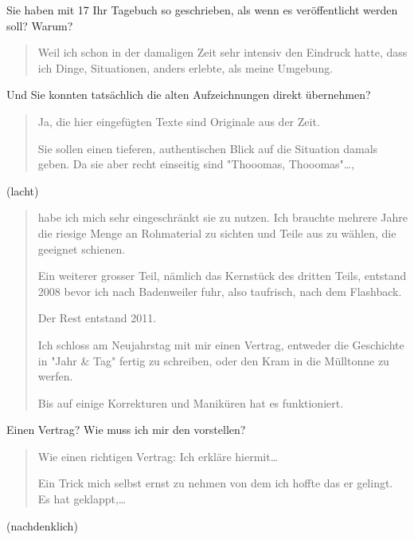 \documentclass[10pt,titlepage,a5paper]{book}
\newenvironment{tg}{\begin{quote}\em}{\end{quote}}
\begin{document}
Sie haben mit 17 Ihr Tagebuch so geschrieben, als wenn es ver\-öffentlicht werden soll? Warum?

\begin{tg}

Weil ich schon in der damaligen Zeit sehr intensiv den Eindruck hatte, dass ich Dinge, Situationen, anders erlebte, als meine Umgebung.

\end{tg}

Und Sie konnten tatsächlich die alten Aufzeichnungen direkt über\-nehmen?

\begin{tg}

Ja, die hier eingefügten Texte sind Originale aus der Zeit.

Sie sollen einen tieferen, authentischen Blick auf die Situation damals geben. Da sie aber recht einseitig sind "Thooomas, Thooomas"{}\dots ,

\end{tg}

(lacht)

\begin{tg}
 
 habe ich mich sehr eingeschränkt sie zu nutzen. Ich brauchte mehrere Jahre die riesige Menge an Rohmaterial zu sichten und Teile aus zu wählen, die geeignet schienen.

Ein weiterer grosser Teil, nämlich das Kernstück des dritten Teils, entstand 2008 bevor ich nach Badenweiler fuhr, also taufrisch, nach dem Flashback.

Der Rest entstand 2011.

 Ich schloss am Neujahrstag mit mir einen Vertrag, entweder die Geschichte in "Jahr \& Tag"{} fertig zu schreiben, oder den Kram in die Mülltonne zu werfen.

Bis auf einige Korrekturen und Maniküren hat es funktioniert.

 \end{tg}
 
 Einen Vertrag? Wie muss ich mir den vorstellen?
 
 \begin{tg}
 
 Wie einen richtigen Vertrag: Ich erkläre hiermit\dots
 
 Ein Trick mich selbst ernst zu nehmen von dem ich hoffte das er gelingt. Es hat geklappt,\dots 
 
 \end{tg}
 
 (nachdenklich)
 
\end{document}
